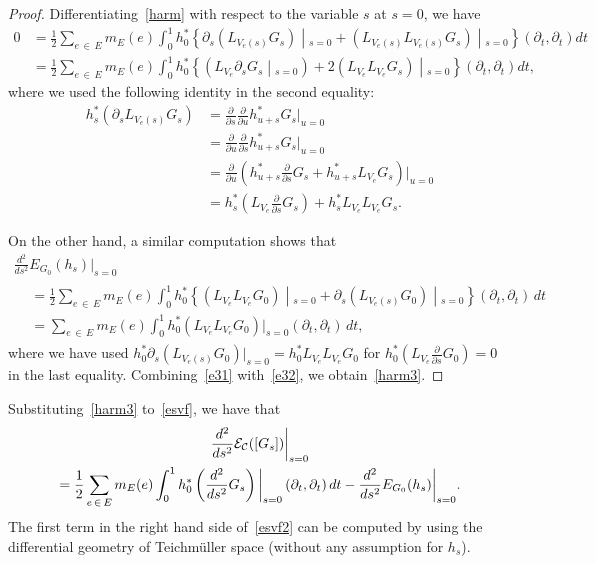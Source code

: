 \documentclass[11pt]{article}
\theoremstyle{definition}
\numberwithin{equation}{section}
\newcommand{\p}{\psi}
\newcommand{\Cc}{\mathcal{C}}
\newcommand{\Ec}{\mathcal{E}}
\renewcommand*\p{\partial}
\begin{document}
\begin{proof}
Differentiating~\eqref{harm} with respect to the variable $s$ at $s=0$, we have
\begin{equation}\label{e31}
\begin{aligned}
0&=\frac{1}{2}\sum_{e\,\in\,E}m_E(e)\int_{0}^1h^*_0\left\{{\p_s}\left(L_{V_e(s)}G_{s}\right)\middle|_{s=0} +\left(L_{V_e(s)}L_{V_e(s)}G_{s}\right)\middle|_{s=0}\right\}\left(\p_{t},\p_{t}\right)dt\\
&=\frac{1}{2}\sum_{e\,\in\,E}m_E(e)\int_{0}^1h_0^*\left\{\left(L_{V_e}{\p_s}G_{s}\middle|_{s=0}\right)+2\left(L_{V_e}L_{V_e}G_{s}\right)\middle|_{s=0}\right\}\left(\p_{t},\p_{t}\right)dt,
\end{aligned}
\end{equation}
where we used the following identity in the second equality:
\begin{align*}
h_s^*\left({\p_s}L_{V_e(s)}G_{s}\right) &=\frac{\p}{\p s}\frac{\p}{\p u}h_{u+s}^*G_{s}\Big|_{u=0}\\
&=\frac{\p}{\p u}\frac{\p}{\p s}h_{u+s}^*G_{s}\Big|_{u=0}\\
&=\frac{\p}{\p u}\left(h_{u+s}^*\frac{\p}{\p s}G_{s}+h^*_{u+s}L_{V_e}G_{s}\right)\bigg|_{u=0}\\
&=h_{s}^*\left(L_{V_e}\frac{\p}{\p s}G_{s}\right)+h_{s}^*L_{V_e}L_{V_e}G_{s}.
\end{align*}

On the other hand, a similar computation shows that
\begin{multline}\label{e32}
\frac{d^2}{d s^2}E_{G_{0}}(h_{s})\bigg|_{s=0}\\
\begin{aligned}
&=\frac{1}{2}\sum_{e\,\in\,E} m_E(e) \int_0^1 h_0^*\left\{\left(L_{V_e}L_{V_e}G_{0}\right)\middle|_{s=0}+\p_s\left(L_{V_e(s)}G_{0}\right)\middle|_{s=0}\right\}\left(\p_t,\p_t\right)\,dt\\
&=\sum_{e\,\in\,E} m_E(e) \int_0^1 h_0^*\left(L_{V_e}L_{V_e}G_{0}\right)|_{s=0}\left(\p_t,\p_t\right)\,dt,
\end{aligned}
\end{multline}
where we have used $h_0^\ast \p_s(L_{V_e(s)}G_{0})|_{s=0}=h_{0}^*L_{V_e}L_{V_e}G_{0}$ for $h_{0}^*(L_{V_e}\tfrac{\p}{\p s}G_{0})=0$ in the last equality. Combining~\eqref{e31} with~\eqref{e32}, we obtain~\eqref{harm3}.
\end{proof}



Substituting~\eqref{harm3} to~\eqref{esvf}, we have that
\begin{multline}\label{esvf2}
\frac{d^2}{d s^2}\Ec_{\Cc}([G_{s}])\bigg{|}_{s=0} \\
=\frac{1}{2}\sum_{e\,\in\,E}m_E(e)\int_{0}^1h_0^*\left(\frac{d^2}{d s^2}G_{s}\right)\bigg|_{s=0}\left(\p_t,\p_t\right)dt -\frac{d^2}{d s^2}E_{G_{0}}(h_{s})\bigg|_{s=0}.
\end{multline}
The first term in the right hand side of~\eqref{esvf2} can be computed by using the differential geometry of Teichm\"uller space (without any assumption for $h_{s}$).
\end{document}
